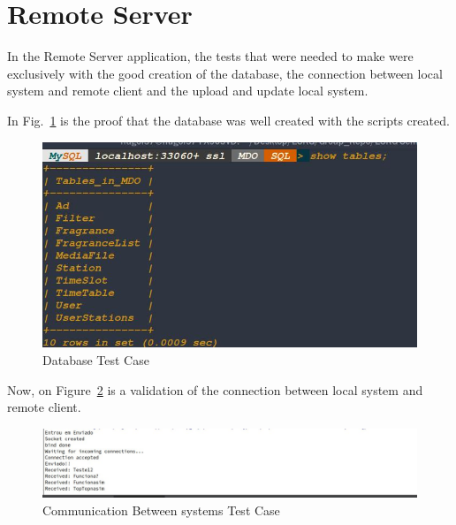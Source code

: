 \section{Remote Server}
\label{sec:test-rs}

In the Remote Server application, the tests that were needed to make were exclusively with the good creation of the database, the connection between local system and remote client and the upload and update local system.

In Fig.~\ref{fig:rs-db-test} is the proof that the database was well created with the scripts created.
%
\begin{figure}[!htb]
    \includegraphics[width=.5\textwidth]{img/rs-db-test.jpg}%
  \caption{Database Test Case}%
  \label{fig:rs-db-test}
\end{figure}

Now, on Figure~\ref{fig:rs-server-test} is a validation of the connection between local system and remote client.
%
\begin{figure}[!htb]
    \includegraphics[width=.7\textwidth]{img/rs-ls-test.jpg}%
  \caption{Communication Between systems Test Case}%
  \label{fig:rs-server-test}
\end{figure}

